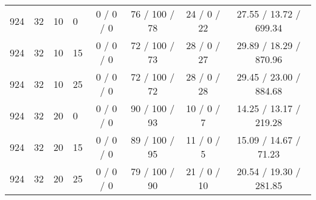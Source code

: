 \begin{table}[p]
\begin{tabular}{llllcccc}
924 & 32 & 10 & 0 & 0 / 0 / 0 & 76 / 100 / 78 & 24 / 0 / 22 & 27.55 / 13.72 / 699.34 \\
924 & 32 & 10 & 15 & 0 / 0 / 0 & 72 / 100 / 73 & 28 / 0 / 27 & 29.89 / 18.29 / 870.96 \\
924 & 32 & 10 & 25 & 0 / 0 / 0 & 72 / 100 / 72 & 28 / 0 / 28 & 29.45 / 23.00 / 884.68 \\
924 & 32 & 20 & 0 & 0 / 0 / 0 & 90 / 100 / 93 & 10 / 0 / 7 & 14.25 / 13.17 / 219.28 \\
924 & 32 & 20 & 15 & 0 / 0 / 0 & 89 / 100 / 95 & 11 / 0 / 5 & 15.09 / 14.67 / 71.23 \\
924 & 32 & 20 & 25 & 0 / 0 / 0 & 79 / 100 / 90 & 21 / 0 / 10 & 20.54 / 19.30 / 281.85 \\
\bottomrule
\end{tabular}
\end{table}
